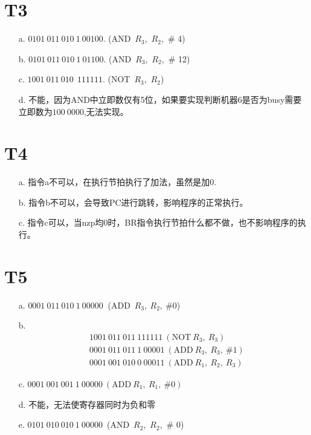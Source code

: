 \documentclass{article}
\begin{document}
\section*{T3}
\begin{enumerate}
    \item [a.]$0101\ 011\ 010\ 1\ 00100$. (AND\ $R_3$,\ $R_2$,\ \# 4)
    \item [b.]$0101\ 011\ 010\ 1\ 01100$. (AND\ $R_3$,\ $R_2$,\ \# 12)
    \item [c.]$1001\ 011\ 010\ \ 111111$. (NOT\ $R_3$,\ $R_2$)
    \item [d.]不能，因为AND中立即数仅有5位，如果要实现判断机器6是否为busy需要立即数为$100\ 0000$,无法实现。
\end{enumerate}

\section*{T4}
    \begin{enumerate}
        \item [a.]指令a不可以，在执行节拍执行了加法，虽然是加0.
        \item [b.]指令b不可以，会导致PC进行跳转，影响程序的正常执行。
        \item [c.]指令c可以，当nzp均0时，BR指令执行节拍什么都不做，也不影响程序的执行。
    \end{enumerate}
    
\section*{T5}
\begin{enumerate}
    \item [a.]$0001\ 011\ 010\ 1\ 00000\ $ (ADD\ $R_3,\ R_2,\ \# 0$)
    \item [b.]
    \begin{align*}
        &1001\ 011\ 011\ 111111\  (\mbox{NOT}\ R_3,\ R_3)\\
        &0001\ 011\ 011\ 1\ 00001\ (\mbox{ADD}\ R_3,\ R_3,\ \# 1)\\
        &0001\ 001\ 010\ 0\ 00011\ (\mbox{ADD}\ R_1,\ R_2,\ R_3)
    \end{align*}
    \item [c.]$0001\ 001\ 001\ 1\ 00000\ (\mbox{ADD}\ R_1,\ R_1,\ \# 0)$
    \item [d.]不能，无法使寄存器同时为负和零
    \item [e.]$0101\ 010\ 010\ 1\ 00000$\ (AND\ $R_2$,\ $R_2$,\ \# 0)
\end{enumerate}
\end{document}
